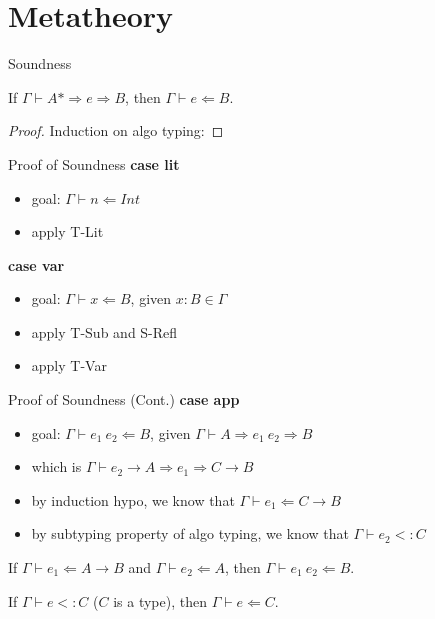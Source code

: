 \documentclass[compress,10pt,aspectratio=169]{beamer}
\begin{document}
\section{Metatheory}

\begin{frame}{Soundness}
\begin{theorem}[Soundness]
If $\Gamma \vdash A* \Rightarrow e \Rightarrow B$, then $\Gamma \vdash e \Leftarrow B.$
\begin{proof}
Induction on algo typing:
\end{proof}
\end{theorem}
\end{frame}

\begin{frame}{Proof of Soundness}
\textbf{case lit}
\begin{itemize}
    \item goal: $\Gamma \vdash n \Leftarrow Int$
    \item apply T-Lit
\end{itemize}
\noindent\makebox[\linewidth]{\rule{\paperwidth}{0.4pt}}
\textbf{case var}
\begin{itemize}
    \item goal: $\Gamma \vdash x \Leftarrow B$, given $x : B \in \Gamma$
    \item apply T-Sub and S-Refl
    \item apply T-Var
\end{itemize}
\end{frame}

\begin{frame}{Proof of Soundness (Cont.)}
\textbf{case app}
\begin{itemize}
    \item goal: $\Gamma \vdash e_1~e_2 \Leftarrow B$, given $\Gamma \vdash A \Rightarrow e_1~e_2 \Rightarrow B$
    \item which is $\Gamma \vdash \boxed{e_2} \rightarrow A \Rightarrow e_1 \Rightarrow C \rightarrow B$
    \item by induction hypo, we know that $\Gamma \vdash e_1 \Leftarrow C \rightarrow B$
    \item by subtyping property of algo typing, we know that $\Gamma \vdash \boxed{e_2} <: C$
\end{itemize}
\noindent\makebox[\linewidth]{\rule{\paperwidth}{0.4pt}}
\begin{lemma}
If $\Gamma \vdash e_1 \Leftarrow A \rightarrow B$ and $\Gamma \vdash e_2 \Leftarrow A$, then $\Gamma \vdash e_1~e_2 \Leftarrow B$.
\end{lemma}
\begin{lemma}
If 	$\Gamma \vdash \boxed{e} <: C$ ($C$ is a type), then $\Gamma \vdash e \Leftarrow C$.
\end{lemma}
\end{frame}
\end{document}

